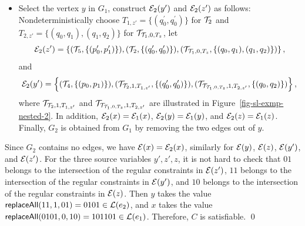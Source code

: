 \begin{example}
\begin{itemize}
%
\item Select the vertex $y$ in $G_1$, construct $\mathcal{E}_2(y')$ and $\mathcal{E}_2(z')$ as follows: Nondeterministically choose $T_{1,z'} = \{(q^\prime_0, q^\prime_0)\}$  for $\mathcal{T}_2$ and $T_{2,z'}=\{(q_0,q_1),(q_1,q_2)\}$ for $\mathcal{T}_{\mathcal{T}_1, 0, T_z}$, let 
$$\mathcal{E}_2(z')=\left\{(\mathcal{T}_5, \{(p^{\prime}_0, p^{\prime}_1)\}), (\mathcal{T}_2, \{(q^\prime_0, q^\prime_0)\}), (\mathcal{T}_{\mathcal{T}_1, 0, T_z}, \{(q_0,q_1),(q_1,q_2)\}) \right\},$$ 
and 
$$\mathcal{E}_2(y')=\left\{ (\mathcal{T}_4, \{(p_0, p_1)\}), (\mathcal{T}_{\mathcal{T}_2, 1, T_{1,z'}}, \{(q^\prime_0, q^\prime_0)\}), (\mathcal{T}_{\mathcal{T}_{\mathcal{T}_1, 0, T_z}, 1, T_{2,z'}}, \{(q_0,q_2)\}) \right\},$$
where $\mathcal{T}_{\mathcal{T}_2, 1, T_{1,z'}}$ and $\mathcal{T}_{\mathcal{T}_{\mathcal{T}_1, 0, T_z}, 1, T_{2,z'}}$ are illustrated in Figure~\ref{fig-sl-exmp-nested-2}. In addition, $\mathcal{E}_2(x)=\mathcal{E}_1(x)$, $\mathcal{E}_2(y)=\mathcal{E}_1(y)$, and $\mathcal{E}_2(z)=\mathcal{E}_1(z)$. Finally, $G_2$ is obtained from $G_1$ by removing the two edges out of $y$. 
%
\end{itemize}
Since $G_2$ contains no edges, we have $\mathcal{E}(x)=\mathcal{E}_2(x)$, similarly for $\mathcal{E}(y)$, $\mathcal{E}(z)$, $\mathcal{E}(y')$, and $\mathcal{E}(z')$.
For the three source variables $y', z', z$, it is not hard to check that $01$ belongs to the intersection of the regular constraints in $\mathcal{E}(z')$, $11$ belongs to the intersection of the regular constraints in $\mathcal{E}(y')$, and $10$ belongs to the intersection of the regular constraints in $\mathcal{E}(z)$. Then $y$ takes the value $\mathsf{replaceAll}(11, 1, 01)=0101 \in \mathcal{L}(e_2)$, and $x$ takes the value $\mathsf{replaceAll}(0101, 0, 10)=101101 \in \mathcal{L}(e_1)$. Therefore, $C$ is satisfiable. \qed
\begin{figure}[htbp]
\begin{center}

\end{center}
\end{figure}
\end{example}
